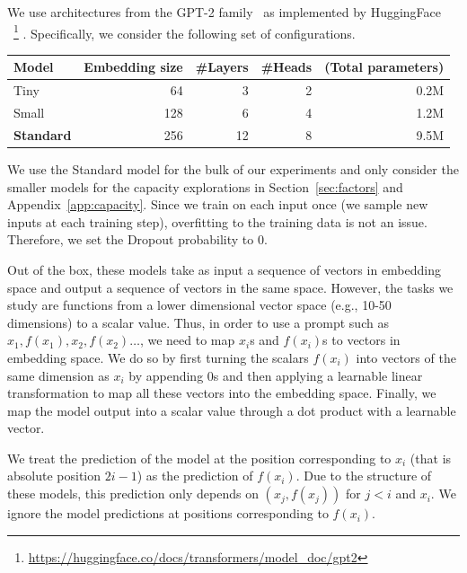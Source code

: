 \documentclass{article}
\begin{document}
We use architectures from the GPT-2 family~\citep{radford2018improving} as implemented by HuggingFace~\citep{wolf-etal-2020-transformers}
~\footnote{\url{https://huggingface.co/docs/transformers/model_doc/gpt2}} .
Specifically, we consider the following set of configurations.
\begin{center}
    \begin{tabular}{lrrrr}
    \toprule
        Model & Embedding size & \#Layers & \#Heads & (Total parameters) \\
    \midrule
        Tiny & 64 & 3 & 2 & 0.2M \\
        Small & 128 & 6 & 4 & 1.2M \\
        \textbf{Standard} & 256 & 12 & 8 & 9.5M \\
    \bottomrule
    \end{tabular}
\end{center}
We use the Standard model for the bulk of our experiments and only consider the smaller models for the capacity explorations in Section~\ref{sec:factors} and Appendix~\ref{app:capacity}.
Since we train on each input once (we sample new inputs at each training step), overfitting to the training data is not an issue. Therefore, we set the Dropout probability to 0.

Out of the box, these models take as input a sequence of vectors in embedding space and output a sequence of vectors in the same space.
However, the tasks we study are functions from a lower dimensional vector space (e.g., 10-50 dimensions) to a scalar value.
Thus, in order to use a prompt such as $x_1, f(x_1), x_2, f(x_2)\ldots$, we need to map $x_i$s and $f(x_i)$s to vectors in embedding space.
We do so by first turning the scalars $f(x_i)$ into vectors of the same dimension as $x_i$ by appending 0s and then applying a learnable linear transformation to map all these vectors into the embedding space.
Finally, we map the model output into a scalar value through a dot product with a learnable vector.

We treat the prediction of the model at the position corresponding to $x_i$ (that is absolute position $2i-1$) as the prediction of $f(x_i)$.
Due to the structure of these models, this prediction only depends on $(x_j, f(x_j))$ for $j<i$ and $x_i$.
We ignore the model predictions at positions corresponding to $f(x_i)$.
\end{document}

